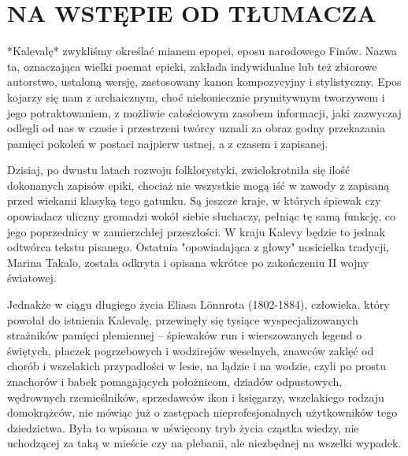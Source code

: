 \section{NA WSTĘPIE OD TŁUMACZA}

*Kalevalę* zwykliśmy określać mianem epopei, eposu narodowego Finów. Nazwa ta, oznaczająca wielki poemat epicki, zakłada indywidualne lub też zbiorowe autorstwo, ustaloną wersję, zastosowany kanon kompozycyjny i stylistyczny. Epos kojarzy się nam z archaicznym, choć niekoniecznie prymitywnym tworzywem i jego potraktowaniem, z możliwie całościowym zasobem informacji, jaki zazwyczaj odlegli od nas w czasie i przestrzeni twórcy uznali za obraz godny przekazania pamięci pokoleń w postaci najpierw ustnej, a z czasem i zapisanej.

Dzisiaj, po dwustu latach rozwoju folklorystyki, zwielokrotniła się ilość dokonanych zapisów epiki, chociaż nie wszystkie mogą iść w zawody z zapisaną przed wiekami klasyką tego gatunku. Są jeszcze kraje, w których śpiewak czy opowiadacz uliczny gromadzi wokół siebie słuchaczy, pełniąc tę samą funkcję, co jego poprzednicy w zamierzchłej przeszłości. W kraju Kalevy będzie to jednak odtwórca tekstu pisanego. Ostatnia "opowiadająca z głowy" nosicielka tradycji, Marina Takalo, została odkryta i opisana wkrótce po zakończeniu II wojny światowej.

Jednakże w ciągu długiego życia Eliasa Lönnrota (1802-1884), człowieka, który powołał do istnienia Kalevalę, przewinęły się tysiące wyspecjalizowanych strażników pamięci plemiennej -- śpiewaków run i wierszowanych legend o świętych, płaczek pogrzebowych i wodzirejów weselnych, znawców zaklęć od chorób i wszelakich przypadłości w lesie, na lądzie i na wodzie, czyli po prostu znachorów i babek pomagających położnicom, dziadów odpustowych, wędrownych rzemieślników, sprzedawców ikon i księgarzy, wszelakiego rodzaju domokrążców, nie mówiąc już o zastępach nieprofesjonalnych użytkowników tego dziedzictwa. Była to wpisana w uświęcony tryb życia cząstka wiedzy, nie uchodzącej za taką w mieście czy na plebanii, ale niezbędnej na wszelki wypadek.

